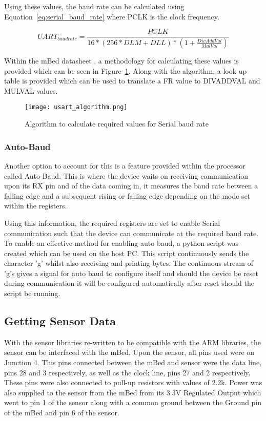 Using these values, the baud rate can be calculated using Equation~\ref{eq:serial_baud_rate} where PCLK is the clock frequency\cite{mbed_datasheet}.

\begin{equation}
	\label{eq:serial_baud_rate}
	UART_{baud rate} = \frac{PCLK}{16 * (256 * DLM + DLL) * (1 + \frac{DivAddVal}{MulVal})}
\end{equation}

Within the mBed datasheet \cite{mbed_datasheet}, a methodology for calculating these values is provided which can be seen in Figure~\ref{fig:serial_algo}. Along with the algorithm, a look up table is provided which can be used to translate a FR value to DIVADDVAL and MULVAL values. 

\begin{figure}
	\centering
	\texttt{[image: usart\_algorithm.png]}
	\caption{Algorithm to calculate required values for Serial baud rate}
	\label{fig:serial_algo}
\end{figure}

\subsubsection{Auto-Baud}

Another option to account for this is a feature provided within the processor called Auto-Baud\cite{mbed_datasheet}. This is where the device waits on receiving communication upon its RX pin and of the data coming in, it measures the baud rate between a falling edge and a subsequent rising or falling edge depending on the mode set within the registers.

Using this information, the required registers are set to enable Serial communication such that the device can communicate at the required baud rate. To enable an effective method for enabling auto baud, a python script was created which can be used on the host PC. This script continuously sends the character 'g' whilst also receiving and printing bytes. The continuous stream of 'g's gives a signal for auto baud to configure itself and should the device be reset during communication it will be configured automatically after reset should the script be running.

\subsection{Getting Sensor Data}

With  the sensor libraries re-written to be compatible with the ARM libraries, the sensor can be interfaced with the mBed. Upon the sensor, all pins used were on Junction 4. This pins connected between the mBed and sensor were the data line, pins 28 and 3 respectively, as well as the clock line, pins 27 and 2 respectively. These pins were also connected to pull-up resistors with values of 2.2k\ohm. Power was also supplied to the sensor from the mBed from its 3.3V Regulated Output which went to pin 1 of the sensor along with a common ground between the Ground pin of the mBed and pin 6 of the sensor. 

